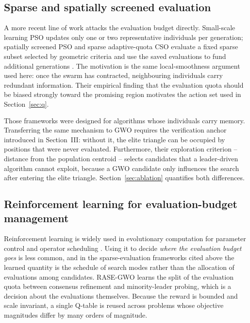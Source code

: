 \subsection{Sparse and spatially screened evaluation}

A more recent line of work attacks the evaluation budget directly. Small-scale
learning PSO updates only one or two representative individuals per generation;
spatially screened PSO and sparse adaptive-quota CSO evaluate a fixed sparse
subset selected by geometric criteria and use the saved evaluations to fund
additional generations \cite{ssl-pso,ss-rlpso,saq-cso}. The motivation is the
same local-smoothness argument used here: once the swarm has contracted,
neighbouring individuals carry redundant information. Their empirical finding
that the evaluation quota should be biased strongly toward the promising region
motivates the action set used in Section~\ref{sec:q}.

Those frameworks were designed for algorithms whose individuals carry memory.
Transferring the same mechanism to GWO requires the verification anchor
introduced in Section~III: without it, the elite triangle can be occupied by
positions that were never evaluated. Furthermore, their exploration criterion
-- distance from the population centroid -- selects candidates that a
leader-driven algorithm cannot exploit, because a GWO candidate only influences
the search after entering the elite triangle. Section~\ref{sec:ablation}
quantifies both differences.

\subsection{Reinforcement learning for evaluation-budget management}

Reinforcement learning is widely used in evolutionary computation for parameter
control and operator scheduling \cite{...}. Using it to decide \emph{where the
evaluation budget goes} is less common, and in the sparse-evaluation
frameworks cited above the learned quantity is the schedule of search modes
rather than the allocation of evaluations among candidates. RASE-GWO learns the
split of the evaluation quota between consensus refinement and minority-leader
probing, which is a decision about the evaluations themselves. Because the
reward is bounded and scale invariant, a single Q-table is reused across
problems whose objective magnitudes differ by many orders of magnitude.
